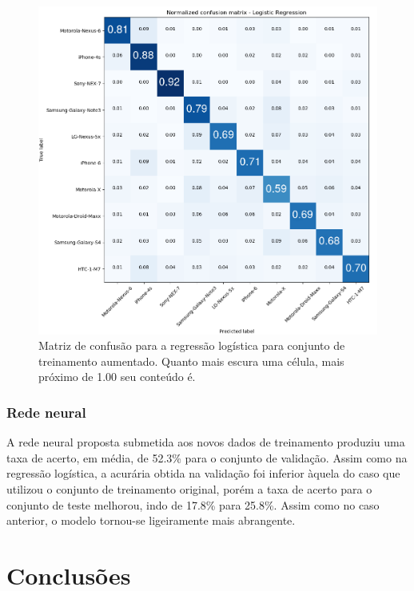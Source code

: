 \documentclass[10pt,twocolumn,letterpaper]{article}
\begin{document}
\begin{figure}
    \centering
    \includegraphics[width=\columnwidth]{images/lr-crop.png}
    \caption{Matriz de confusão para a regressão logística para conjunto de treinamento aumentado. Quanto mais escura uma célula, mais próximo de 1.00 seu conteúdo é.}
    \label{img:lr2}
\end{figure}

\subsubsection {Rede neural}

A rede neural proposta submetida aos novos dados de treinamento produziu uma taxa de acerto, em média, de 52.3\% para o conjunto de validação. Assim como na regressão logística, a acurária obtida na validação foi inferior àquela do caso que utilizou o conjunto de treinamento original, porém a taxa de acerto para o conjunto de teste melhorou, indo de 17.8\% para 25.8\%. Assim como no caso anterior, o modelo tornou-se ligeiramente mais abrangente.

\section{Conclusões}
\end{document}
